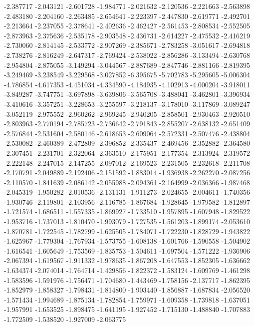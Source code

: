 -2.387717
-2.043121
-2.601728
-1.984771
-2.021632
-2.120536
-2.221663
-2.563898
-2.483180
-2.204160
-2.263485
-2.654641
-2.223397
-2.447830
-2.619771
-2.492701
-2.213664
-2.237055
-2.378641
-2.402636
-2.462427
-2.561453
-2.808534
-2.552505
-2.873963
-2.375636
-2.535178
-2.903548
-2.436731
-2.614227
-2.475532
-2.416219
-2.730060
-2.814145
-2.533772
-2.907269
-2.385671
-2.783258
-3.051617
-2.694818
-2.738276
-2.816249
-2.647317
-2.769424
-2.538022
-2.856286
-3.133494
-2.630768
-2.954804
-2.875055
-3.149294
-3.044567
-2.887689
-2.847746
-2.881166
-2.819395
-3.249469
-3.238549
-3.229568
-3.027852
-6.395675
-5.702783
-5.295605
-5.006304
-4.786854
-4.617353
-4.451034
-4.334590
-4.184935
-4.102913
-4.000204
-3.918011
-3.849287
-3.747751
-3.697898
-3.639806
-3.565708
-3.488041
-3.462801
-3.396934
-3.410616
-3.357251
-3.228653
-3.255597
-3.218137
-3.178010
-3.117869
-3.089247
-3.052119
-2.975552
-2.960262
-2.969245
-2.940205
-2.858501
-2.930463
-2.920510
-2.803963
-2.770194
-2.785723
-2.736642
-2.791843
-2.855207
-2.638132
-2.651409
-2.576844
-2.531604
-2.580146
-2.618653
-2.609064
-2.572331
-2.507476
-2.438804
-2.530082
-2.460389
-2.472809
-2.396852
-2.335437
-2.469456
-2.352882
-2.364580
-2.307451
-2.231701
-2.322064
-2.363510
-2.175951
-2.177354
-2.313924
-2.319572
-2.222148
-2.247015
-2.147255
-2.097012
-2.169523
-2.231505
-2.232618
-2.211708
-2.170791
-2.049889
-2.192406
-2.151592
-1.883014
-1.936938
-2.262270
-2.087256
-2.110570
-1.841639
-2.086142
-2.055988
-2.094361
-2.164999
-2.036366
-1.987468
-2.045319
-1.950282
-2.010536
-2.131131
-1.911273
-2.024655
-2.004611
-1.740356
-1.930746
-2.119801
-2.103956
-2.116785
-1.867684
-1.928645
-1.979582
-1.812897
-1.721574
-1.686511
-1.557335
-1.869927
-1.733510
-1.957895
-1.607948
-1.829522
-1.953716
-1.737013
-1.810470
-1.993079
-1.727535
-1.561203
-1.899174
-2.053610
-1.870781
-1.722545
-1.782799
-1.625505
-1.784071
-1.722230
-1.828729
-1.943822
-1.625967
-1.779304
-1.767934
-1.573755
-1.608138
-1.601766
-1.590558
-1.504902
-1.616541
-1.605649
-1.753569
-1.835753
-1.504611
-1.697504
-1.571222
-1.936906
-2.067394
-1.619567
-1.911332
-1.978635
-1.867208
-1.647553
-1.852305
-1.636662
-1.634374
-2.074014
-1.764714
-1.429856
-1.822372
-1.583124
-1.609769
-1.461298
-1.583596
-1.591976
-1.756471
-1.704680
-1.443469
-1.758156
-2.137717
-1.862395
-1.852979
-1.858327
-1.798431
-1.814800
-1.903440
-1.856887
-1.687834
-2.056520
-1.571434
-1.994689
-1.875134
-1.782854
-1.759971
-1.609358
-1.739818
-1.637051
-1.957991
-1.653525
-1.898475
-1.641195
-1.927452
-1.715130
-1.488840
-1.707883
-1.772509
-1.538520
-1.927009
-2.063775
